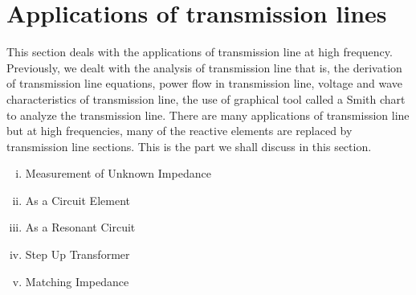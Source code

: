 \section{Applications of transmission lines}\label{lec:lec10}
This section deals with the applications of transmission line at high frequency. Previously, we dealt with the
analysis of transmission line that is, the derivation of transmission line equations, power flow in transmission line, voltage and wave characteristics of transmission line, the use of graphical tool called a Smith chart to analyze the transmission line.
There are many applications of transmission line but at high frequencies, many of the reactive elements are replaced by transmission line sections. This is the part we shall discuss in this section.
\begin{enumerate}[(i)]
\item Measurement of Unknown Impedance 
\item As a Circuit Element
\item As a Resonant Circuit
\item Step Up Transformer 
\item Matching Impedance
\end{enumerate}

